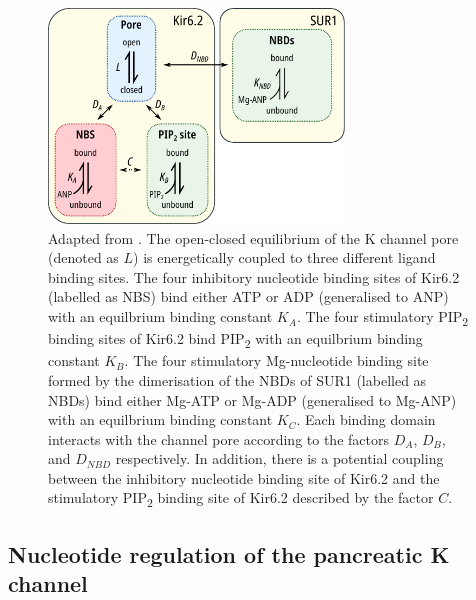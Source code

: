 \begin{figure}[h]
	\centering
	\includegraphics[width=0.7\textwidth]{regulation_diagram.pdf}
	\caption[Modes of regulation of K\ATP{}]{
	Adapted from \cite{puljung_cryo-electron_2018}.
	The open-closed equilibrium of the K\ATP{} channel pore (denoted as $L$) is energetically coupled to three different ligand binding sites.
	The four inhibitory nucleotide binding sites of Kir6.2 (labelled as NBS) bind either ATP or ADP (generalised to ANP) with an equilbrium binding constant $K_A$.
	The four stimulatory PIP\textsubscript{2} binding sites of Kir6.2 bind PIP\textsubscript{2} with an equilbrium binding constant $K_B$.
	The four stimulatory Mg-nucleotide binding site formed by the dimerisation of the NBDs of SUR1 (labelled as NBDs) bind either Mg-ATP or Mg-ADP (generalised to Mg-ANP) with an equilbrium binding constant $K_C$.
	Each binding domain interacts with the channel pore according to the factors $D_A$, $D_B$, and $D_{NBD}$ respectively.
	In addition, there is a potential coupling between the inhibitory nucleotide binding site of Kir6.2 and the stimulatory PIP\textsubscript{2} binding site of Kir6.2 described by the factor $C$.
	}\label{ch1fig:regulation_diagram}
\end{figure}

\subsection{Nucleotide regulation of the pancreatic K\ATP{} channel}

